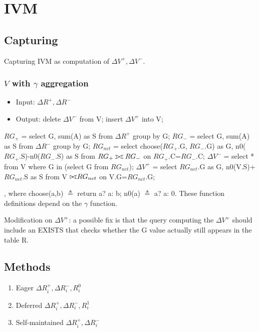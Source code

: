 \documentclass[a4paper]{report}
\def\ojoin{\setbox0=\hbox{$\bowtie$}%
  \rule[-.02ex]{.25em}{.4pt}\llap{\rule[\ht0]{.25em}{.4pt}}}
\def\rightouterjoin{\mathbin{\bowtie\mkern-5.8mu\ojoin}}
\def\fullouterjoin{\mathbin{\ojoin\mkern-5.8mu\bowtie\mkern-5.8mu\ojoin}}
\begin{document}
\section{IVM}
\subsection{Capturing}
Capturing IVM as computation of $\Delta V^+, \Delta V^-$. 

\subsubsection{$V$ with $\gamma$ aggregation}
\begin{itemize}
\item Input: $\Delta R^+, \Delta R^-$
\item Output: delete $\Delta V^-$ from V; insert $\Delta V^+$ into V;
\end{itemize}

\begin{pseudo}
$RG_+$ = select G, sum(A) as S from $\Delta R^+$ group by G;
$RG_-$ = select G, sum(A) as S from $\Delta R^-$ group by G;
$RG_{net}$ = select choose($RG_+$.G, $RG_-$.G) as G, n0($RG_+$.S)-n0($RG_-$.S) as S
         from $RG_+ \fullouterjoin RG_-$ on $RG_+$.C=$RG_-$.C;
$\Delta V^-$ = select * from V where G in (select G from $RG_{net}$);
$\Delta V^+$ = select $RG_{net}$.G as G, n0(V.S)+$RG_{net}$.S as S
        from V $\rightouterjoin RG_{net}$ on V.G=$RG_{net}$.G;
\end{pseudo}

, where choose(a,b) $\triangleq$ return a? a: b; n0(a) $\triangleq$ a? a: 0. These function definitions depend on the $\gamma$ function.

Modification on $\Delta V^+$: a possible fix is that the query computing the $\Delta V^+$ should include an EXISTS that checks whether the G value actually still appears in the table R.

\subsection{Methods}
\begin{enumerate}
\item Eager $\Delta R_i^+, \Delta R_i^-, R_i^0$
\item Deferred $\Delta R_i^+, \Delta R_i^-, R_i^1$
\item Self-maintained $\Delta R_i^+, \Delta R_i^-$
\end{enumerate}
\end{document}

